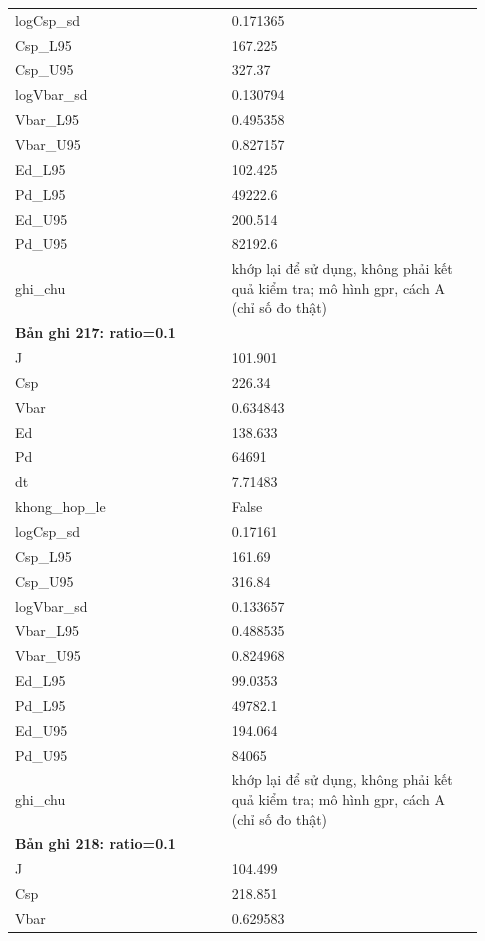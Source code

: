 \begin{longtable}{p{0.43\linewidth}p{0.50\linewidth}}
logCsp\_\allowbreak sd & 0.171365 \\
Csp\_\allowbreak L95 & 167.225 \\
Csp\_\allowbreak U95 & 327.37 \\
logVbar\_\allowbreak sd & 0.130794 \\
Vbar\_\allowbreak L95 & 0.495358 \\
Vbar\_\allowbreak U95 & 0.827157 \\
Ed\_\allowbreak L95 & 102.425 \\
Pd\_\allowbreak L95 & 49222.6 \\
Ed\_\allowbreak U95 & 200.514 \\
Pd\_\allowbreak U95 & 82192.6 \\
ghi\_\allowbreak chu & khớp lại để sử dụng, không phải kết quả kiểm tra; mô hình gpr, cách A (chỉ số đo thật) \\
\midrule
\multicolumn{2}{p{0.95\linewidth}}{\textbf{Bản ghi 217: ratio=0.1}} \\
J & 101.901 \\
Csp & 226.34 \\
Vbar & 0.634843 \\
Ed & 138.633 \\
Pd & 64691 \\
dt & 7.71483 \\
khong\_\allowbreak hop\_\allowbreak le & False \\
logCsp\_\allowbreak sd & 0.17161 \\
Csp\_\allowbreak L95 & 161.69 \\
Csp\_\allowbreak U95 & 316.84 \\
logVbar\_\allowbreak sd & 0.133657 \\
Vbar\_\allowbreak L95 & 0.488535 \\
Vbar\_\allowbreak U95 & 0.824968 \\
Ed\_\allowbreak L95 & 99.0353 \\
Pd\_\allowbreak L95 & 49782.1 \\
Ed\_\allowbreak U95 & 194.064 \\
Pd\_\allowbreak U95 & 84065 \\
ghi\_\allowbreak chu & khớp lại để sử dụng, không phải kết quả kiểm tra; mô hình gpr, cách A (chỉ số đo thật) \\
\midrule
\multicolumn{2}{p{0.95\linewidth}}{\textbf{Bản ghi 218: ratio=0.1}} \\
J & 104.499 \\
Csp & 218.851 \\
Vbar & 0.629583 \\

\end{longtable}
